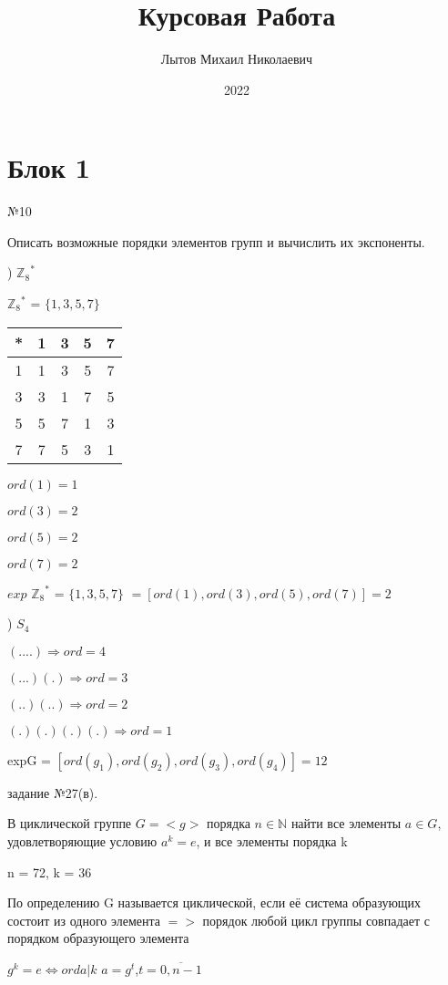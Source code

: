 \documentclass[14pt, letterpaper, twoside]{article}
\title{Курсовая Работа}
\author{Лытов Михаил Николаевич}
\date{2022}
\begin{document}
\maketitle
\section{Блок 1}
\noindent №10

Описать возможные порядки элементов групп и вычислить их экспоненты.


) ${\mathbb {Z}_8}^*$

${\mathbb {Z}_8}^*$ = $\{ 1,3,5,7 \}$

\begin{tabular}{ || c | c | c | c | c || }
    \hline
     * & 1 & 3 &5 & 7 \\ \hline
    1& 1 & 3 &5 & 7 \\ \hline
    3& 3 & 1 &7 & 5 \\ \hline
    5& 5 & 7 &1 & 3 \\ \hline
    7& 7 & 5 &3 & 1 \\ \hline
\end{tabular}
\par
$ord(1) = 1$
\par
$ord(3) = 2$
\par
$ord(5) = 2$
\par
$ord(7) = 2$
\par
$exp$ ${\mathbb {Z}_8}^*$ = $\{ 1,3,5,7 \}$ $= [ord(1),ord(3),ord(5),ord(7)] = 2$
\par
\par
{}) $S_4$

$(....) \Rightarrow ord = 4$
\par
$(...)(.)   \Rightarrow ord = 3$
\par
$(..)(..)   \Rightarrow ord = 2$
\par
$(.)(.)(.)(.)\Rightarrow ord = 1$

expG = $[ord(g_1),ord(g_2),ord(g_3),ord(g_4)] = 12$
\par
задание №27(в).

В циклической группе $G = <g>$ порядка $n∈ℕ$ найти все элементы $a∈G$, удовлетворяющие условию $a^k = e$, и все элементы порядка k

n = 72, k = 36

По определению G называется циклической, если её система образующих состоит из одного элемента $=>$ порядок любой цикл группы совпадает с порядком образующего элемента

$g^k = e \Leftrightarrow ord a|k$ $a = g^t$,$t = \overline{0,n-1} $
\end{document}
